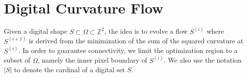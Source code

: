 \documentclass[smallextended]{svjour3}       %
\begin{document}
\section{Digital Curvature Flow}

%	
%
%		
%
%
%

%





Given a digital shape $S \subset \Omega \subset \mathbb{Z}^2$, the idea is to evolve a flow $S^{(i)}$ where $S^{(i+1)}$ is derived from the minimization of the sum of the squared curvature at $S^{(i)}$. In order to guarantee connectivity, we limit the optimization region to a subset of $\Omega$, namely the inner pixel boundary of  $S^{(i)}$. We also use the notation $| S |$ to denote the cardinal of a digital set $S$.
\end{document}
